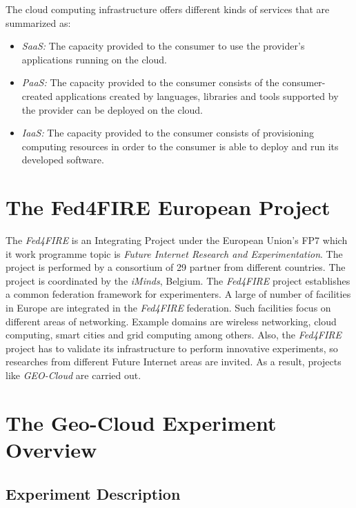 The cloud computing infrastructure offers different kinds of services that are
summarized as:

\begin{itemize}
\item \emph{\ac{SaaS}:} The capacity provided to the consumer
  to use   the provider's applications running on the cloud.
\item \emph{\ac{PaaS}:} The capacity provided to the consumer
  consists of the consumer-created applications created by languages, libraries
  and tools supported by the provider can be deployed on the cloud.
\item \emph{\ac{IaaS}:} The capacity provided to the
  consumer consists of provisioning computing resources in order to the consumer
  is able to deploy and run its developed software.
\end{itemize} 



\section{The Fed4FIRE European Project}%
The \emph{Fed4FIRE} is an Integrating Project under the European Union's \ac{FP7} which it work programme topic is \emph{Future
  Internet Research and Experimentation}. The project is performed by a
consortium of 29 partner from different countries. The project is coordinated by
the \emph{iMinds}, Belgium. 
The \emph{Fed4FIRE} project establishes a common federation framework for
experimenters. A large of number of facilities in Europe are integrated in the
\emph{Fed4FIRE} federation. Such facilities focus on different  areas
of networking. Example domains are wireless networking, cloud computing, smart
cities and grid computing among others.
Also, the \emph{Fed4FIRE} project has to validate its infrastructure to perform
innovative experiments, so researches from different Future Internet areas
are invited. As a result, projects like \emph{GEO-Cloud} are carried out.

\section{The Geo-Cloud Experiment Overview}


\subsection{Experiment Description}

